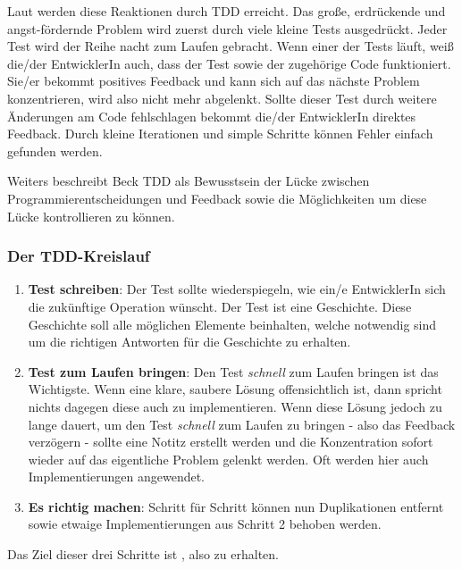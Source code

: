Laut \cite{Beck:2003} werden diese Reaktionen durch TDD erreicht. Das große, erdrückende und angst-fördernde Problem wird zuerst durch viele kleine Tests ausgedrückt. Jeder Test wird der Reihe nacht zum Laufen gebracht. Wenn einer der Tests läuft, weiß die/der EntwicklerIn auch, dass der Test sowie der zugehörige Code funktioniert. Sie/er bekommt positives Feedback und kann sich auf das nächste Problem konzentrieren, wird also nicht mehr abgelenkt. Sollte dieser Test durch weitere Änderungen am Code fehlschlagen bekommt die/der EntwicklerIn direktes Feedback. Durch kleine Iterationen und simple Schritte können Fehler einfach gefunden werden.

Weiters beschreibt Beck TDD als Bewusstsein der Lücke zwischen Programmierentscheidungen und Feedback sowie die Möglichkeiten um diese Lücke kontrollieren zu können.

\subsubsection{Der TDD-Kreislauf}
\begin{enumerate}
  \item \textbf{Test schreiben}:\newline
  Der Test sollte wiederspiegeln, wie ein/e EntwicklerIn sich die zukünftige Operation wünscht. Der Test ist eine Geschichte. Diese Geschichte soll alle möglichen Elemente beinhalten, welche notwendig sind um die richtigen Antworten für die Geschichte zu erhalten.
  \item \textbf{Test zum Laufen bringen}:\newline
  Den Test \textit{schnell} zum Laufen bringen ist das Wichtigste. Wenn eine klare, saubere Lösung offensichtlich ist, dann spricht nichts dagegen diese auch zu implementieren. Wenn diese Lösung jedoch zu lange dauert, um den Test \textit{schnell} zum Laufen zu bringen - also das  Feedback verzögern - sollte eine Notitz erstellt werden und die Konzentration sofort wieder auf das eigentliche Problem gelenkt werden. Oft werden hier auch  Implementierungen angewendet.
  \item \textbf{Es richtig machen}:\newline
  Schritt für Schritt können nun Duplikationen entfernt sowie etwaige  Implementierungen aus Schritt 2 behoben werden.
\end{enumerate}

Das Ziel dieser drei Schritte ist , also  zu erhalten.

